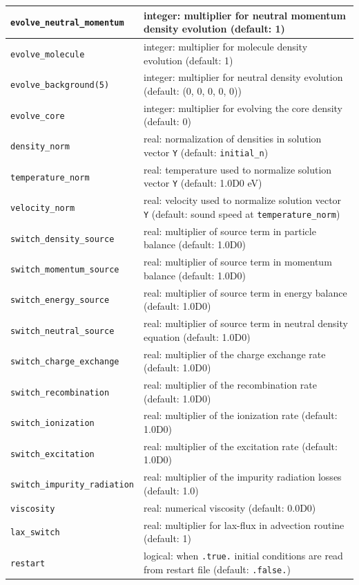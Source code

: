 \documentclass[amsmath,amssymb,a4]{revtex4-2}
\begin{document}
\begin{longtable}{| p{} | p{} |}
    {\tt evolve\_neutral\_momentum} & integer: multiplier for neutral momentum density evolution (default: 1) \\ \hline
    {\tt evolve\_molecule}        & integer: multiplier for molecule density evolution (default: 1) \\ \hline
    {\tt evolve\_background(5)}        & integer: multiplier for neutral density evolution (default: (0, 0, 0, 0, 0)) \\ \hline
    {\tt evolve\_core}        & integer: multiplier for evolving the core density (default: 0) \\ \hline
	{\tt density\_norm}          & real: normalization of densities in solution vector {\tt Y} (default: {\tt initial\_n}) \\ \hline
	{\tt temperature\_norm}      & real: temperature used to normalize solution vector {\tt Y} (default: 1.0D0 eV) \\ \hline
	{\tt velocity\_norm}         & real: velocity used to normalize solution vector {\tt Y} (default: sound speed at {\tt temperature\_norm}) \\ \hline
	{\tt switch\_density\_source} & real: multiplier of source term in particle balance (default: 1.0D0) \\ \hline
	{\tt switch\_momentum\_source}& real: multiplier of source term in momentum balance (default: 1.0D0) \\ \hline
	{\tt switch\_energy\_source}  & real: multiplier of source term in energy balance (default: 1.0D0) \\ \hline
	{\tt switch\_neutral\_source} & real: multiplier of source term in neutral density equation (default: 1.0D0) \\ \hline
	{\tt switch\_charge\_exchange}& real: multiplier of the charge exchange rate (default: 1.0D0) \\ \hline
	{\tt switch\_recombination}  & real: multiplier of the recombination rate (default: 1.0D0) \\ \hline
	{\tt switch\_ionization}     & real: multiplier of the ionization rate (default: 1.0D0) \\ \hline
	{\tt switch\_excitation}     & real: multiplier of the excitation rate (default: 1.0D0) \\ \hline
	{\tt switch\_impurity\_radiation}& real: multiplier of the impurity radiation losses (default: 1.0) \\ \hline
	{\tt viscosity}              & real: numerical viscosity (default: 0.0D0)  \\ \hline
    {\tt lax\_switch}        & real: multiplier for lax-flux in advection routine (default: 1) \\ \hline
	{\tt restart}                & logical: when {\tt .true.} initial conditions are read from restart file (default: {\tt .false.}) \\ \hline
    \hline
\end{longtable}
  
\end{document}
